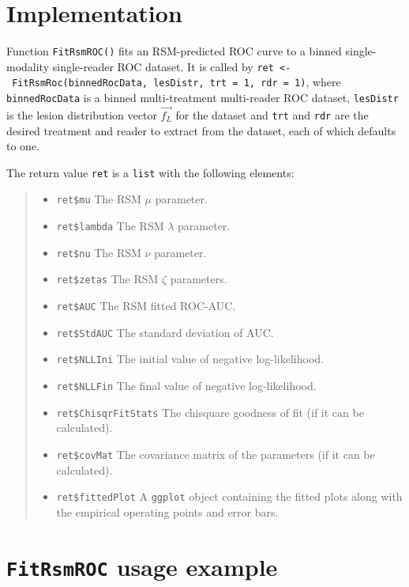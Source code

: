 \documentclass[
]{book}
\providecommand{\tightlist}{%
  \setlength{\itemsep}{0pt}\setlength{\parskip}{0pt}}
\begin{document}
\hypertarget{rsm-fitting-fit-rsm}{%
\section{Implementation}\label{rsm-fitting-fit-rsm}}

Function \texttt{FitRsmROC()} fits an RSM-predicted ROC curve to a binned single-modality single-reader ROC dataset. It is called by \texttt{ret\ \textless{}-\ FitRsmRoc(binnedRocData,\ lesDistr,\ trt\ =\ 1,\ rdr\ =\ 1)}, where \texttt{binnedRocData} is a binned multi-treatment multi-reader ROC dataset, \texttt{lesDistr} is the lesion distribution vector \(\overrightarrow{f_L}\) for the dataset and \texttt{trt} and \texttt{rdr} are the desired treatment and reader to extract from the dataset, each of which defaults to one.

The return value \texttt{ret} is a \texttt{list} with the following elements:

\begin{quote}
\begin{itemize}
\tightlist
\item
  \texttt{ret\$mu} The RSM \(\mu\) parameter.
\item
  \texttt{ret\$lambda} The RSM \(\lambda\) parameter.
\item
  \texttt{ret\$nu} The RSM \(\nu\) parameter.
\item
  \texttt{ret\$zetas} The RSM \(\zeta\) parameters.
\item
  \texttt{ret\$AUC} The RSM fitted ROC-AUC.
\item
  \texttt{ret\$StdAUC} The standard deviation of AUC.
\item
  \texttt{ret\$NLLIni} The initial value of negative log-likelihood.
\item
  \texttt{ret\$NLLFin} The final value of negative log-likelihood.
\item
  \texttt{ret\$ChisqrFitStats} The chisquare goodness of fit (if it can be calculated).
\item
  \texttt{ret\$covMat} The covariance matrix of the parameters (if it can be calculated).
\item
  \texttt{ret\$fittedPlot} A \texttt{ggplot} object containing the fitted plots along with the empirical operating points and error bars.
\end{itemize}
\end{quote}

\hypertarget{rsm-fitting-fitrsmroc-usage-example}{%
\section{\texorpdfstring{\texttt{FitRsmROC} usage example}{FitRsmROC usage example}}\label{rsm-fitting-fitrsmroc-usage-example}}
\end{document}
